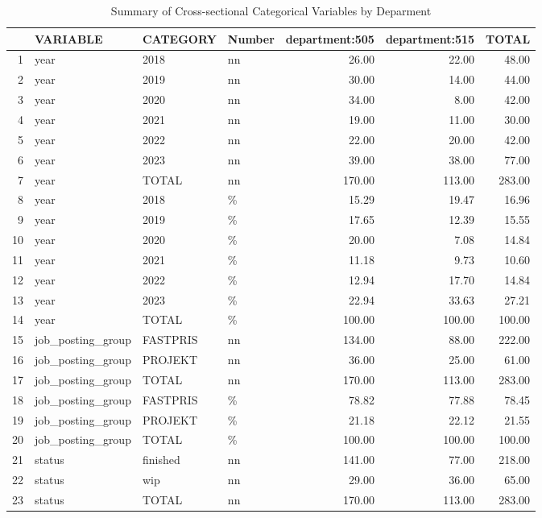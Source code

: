 \begin{sidewaystable}[ht]
\centering
\caption{Summary of Cross-sectional Categorical Variables by Deparment} 
\begin{tabular}{rlllrrr}
  \hline
 & VARIABLE & CATEGORY & Number & department:505 & department:515 & TOTAL \\ 
  \hline
1 & year & 2018 & nn & 26.00 & 22.00 & 48.00 \\ 
  2 & year & 2019 & nn & 30.00 & 14.00 & 44.00 \\ 
  3 & year & 2020 & nn & 34.00 & 8.00 & 42.00 \\ 
  4 & year & 2021 & nn & 19.00 & 11.00 & 30.00 \\ 
  5 & year & 2022 & nn & 22.00 & 20.00 & 42.00 \\ 
  6 & year & 2023 & nn & 39.00 & 38.00 & 77.00 \\ 
  7 & year & TOTAL & nn & 170.00 & 113.00 & 283.00 \\ 
  8 & year & 2018 & \% & 15.29 & 19.47 & 16.96 \\ 
  9 & year & 2019 & \% & 17.65 & 12.39 & 15.55 \\ 
  10 & year & 2020 & \% & 20.00 & 7.08 & 14.84 \\ 
  11 & year & 2021 & \% & 11.18 & 9.73 & 10.60 \\ 
  12 & year & 2022 & \% & 12.94 & 17.70 & 14.84 \\ 
  13 & year & 2023 & \% & 22.94 & 33.63 & 27.21 \\ 
  14 & year & TOTAL & \% & 100.00 & 100.00 & 100.00 \\ 
  15 & job\_posting\_group & FASTPRIS & nn & 134.00 & 88.00 & 222.00 \\ 
  16 & job\_posting\_group & PROJEKT & nn & 36.00 & 25.00 & 61.00 \\ 
  17 & job\_posting\_group & TOTAL & nn & 170.00 & 113.00 & 283.00 \\ 
  18 & job\_posting\_group & FASTPRIS & \% & 78.82 & 77.88 & 78.45 \\ 
  19 & job\_posting\_group & PROJEKT & \% & 21.18 & 22.12 & 21.55 \\ 
  20 & job\_posting\_group & TOTAL & \% & 100.00 & 100.00 & 100.00 \\ 
  21 & status & finished & nn & 141.00 & 77.00 & 218.00 \\ 
  22 & status & wip & nn & 29.00 & 36.00 & 65.00 \\ 
  23 & status & TOTAL & nn & 170.00 & 113.00 & 283.00 \\ 

\end{tabular}
\end{sidewaystable}
